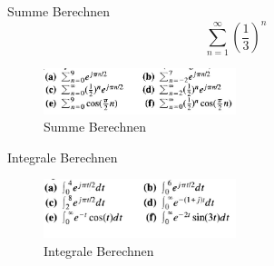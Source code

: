 \documentclass[addpoints,12pt,twoside]{exam} %
\begin{document}
\begin{questions}
            
            \question[12]
            Summe Berechnen 
            \[ \sum_{n=1}^{\infty} \left( \frac{1}{3}  \right)^n
            \]
            \begin{figure}[h]
            \includegraphics[width=0.5\textwidth]{auf2}
            \caption{ Summe Berechnen}
            \label{fig: Summe Berechnen}
            \end{figure}
            
            \question[12]
            Integrale Berechnen
            \begin{figure}[h]
            \includegraphics[width=0.5\textwidth]{auf3}
            \caption{Integrale Berechnen}
            \label{fig:Integrale Berechnen}
            \end{figure}

            
    \end{questions}
\newpage
\end{document}
